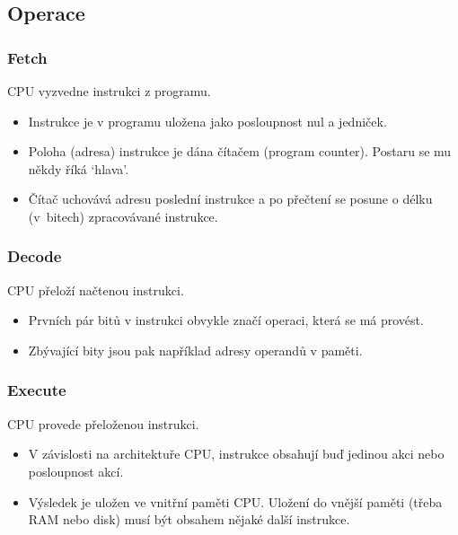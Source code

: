 \documentclass[aspectratio=169,11pt,handout]{beamer}
\begin{document}
\subsection[Operace]{Operace}

\begin{frame}
 \frametitle{Fetch}
 \begin{tcolorbox}[title=Fetch,center,width=.95\textwidth]
  CPU \alert{vyzvedne} instrukci z programu.
 \end{tcolorbox}
 \begin{itemize}
  \item Instrukce je v programu uložena jako posloupnost nul a jedniček.
  \item Poloha (adresa) instrukce je dána čítačem (program counter). Postaru se
   mu někdy říká `hlava'.
  \item Čítač uchovává adresu poslední instrukce a po přečtení se posune o délku
   (v~bitech) zpracovávané instrukce.
 \end{itemize}
\end{frame}

\begin{frame}
 \frametitle{Decode}
 \begin{tcolorbox}[title=Decode,center,width=.95\textwidth]
  CPU \alert{přeloží} načtenou instrukci.
 \end{tcolorbox}
 \begin{itemize}
  \item Prvních pár bitů v instrukci obvykle značí operaci, která se má provést.
  \item Zbývající bity jsou pak například adresy operandů v paměti.
 \end{itemize}
\end{frame}

\begin{frame}
 \frametitle{Execute}
 \begin{tcolorbox}[title=Execute,center,width=.95\textwidth]
  CPU \alert{provede} přeloženou instrukci.
 \end{tcolorbox}
 \begin{itemize}
  \item V závislosti na architektuře CPU, instrukce obsahují buď jedinou akci
   nebo posloupnost akcí.
  \item Výsledek je uložen ve vnitřní paměti CPU. Uložení do vnější paměti
   (třeba RAM nebo disk) musí být obsahem nějaké další instrukce.
 \end{itemize}
\end{frame}
\end{document}
